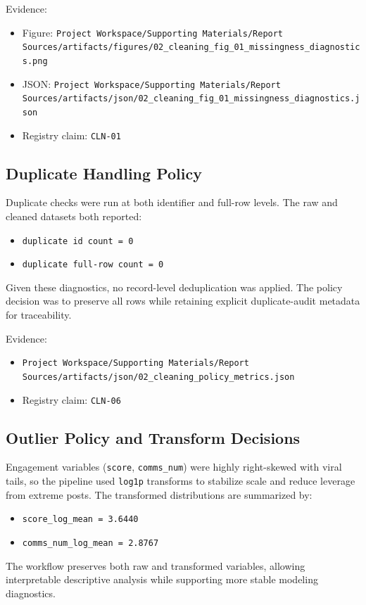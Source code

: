 Evidence:
\begin{itemize}
  \item Figure: \verb|Project Workspace/Supporting Materials/Report Sources/artifacts/figures/02_cleaning_fig_01_missingness_diagnostics.png|
  \item JSON: \verb|Project Workspace/Supporting Materials/Report Sources/artifacts/json/02_cleaning_fig_01_missingness_diagnostics.json|
  \item Registry claim: \texttt{CLN-01}
\end{itemize}

\subsection{Duplicate Handling Policy}
Duplicate checks were run at both identifier and full-row levels. The raw and cleaned datasets both reported:
\begin{itemize}
  \item \texttt{duplicate id count = 0}
  \item \texttt{duplicate full-row count = 0}
\end{itemize}
Given these diagnostics, no record-level deduplication was applied. The policy decision was to preserve all rows while retaining explicit duplicate-audit metadata for traceability.

Evidence:
\begin{itemize}
  \item \verb|Project Workspace/Supporting Materials/Report Sources/artifacts/json/02_cleaning_policy_metrics.json|
  \item Registry claim: \texttt{CLN-06}
\end{itemize}

\subsection{Outlier Policy and Transform Decisions}
Engagement variables (\texttt{score}, \texttt{comms\_num}) were highly right-skewed with viral tails, so the pipeline used \texttt{log1p} transforms to stabilize scale and reduce leverage from extreme posts. The transformed distributions are summarized by:
\begin{itemize}
  \item \texttt{score\_log\_mean = 3.6440}
  \item \texttt{comms\_num\_log\_mean = 2.8767}
\end{itemize}
The workflow preserves both raw and transformed variables, allowing interpretable descriptive analysis while supporting more stable modeling diagnostics.

